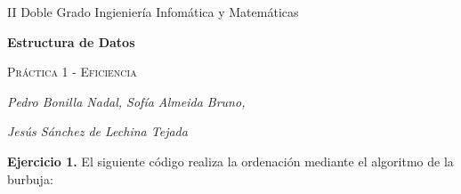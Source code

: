 \documentclass[titlepage, 12pt,a4paper]{article}
\author{Pedro Bonilla Nadal, Sofía Almeida Bruno, Jesús Sáchez de Lechina Tejada}
\date{\small{}}
\begin{document}
\begin{titlepage}
	\vspace{1cm}
	\centering
	{\small II Doble Grado Ingieniería Infomática y Matemáticas  \par}
	\vspace{3.5cm}
	{\huge\bfseries  Estructura de Datos\par}
	\vspace{2.5cm}
	{\scshape\Large Práctica 1 - Eficiencia\par}
	\vspace{2cm}
	{\Large\itshape Pedro Bonilla Nadal, Sofía Almeida Bruno,  \par}
	{\Large\itshape Jesús Sánchez de Lechina Tejada \par}
	\vfill

	\vfill

	{\large \par}
\end{titlepage}

	\textbf{\large Ejercicio 1.} El siguiente código realiza la ordenación mediante el algoritmo de la burbuja:\vspace {1em}
	
\end{document}
